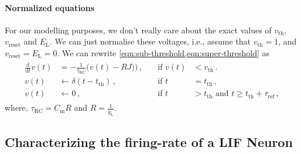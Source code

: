 \documentclass[10pt,letterpaper,oneside]{article}
\begin{document}

\paragraph{Normalized equations}
For our modelling purposes, we don't really care about the exact values of $v_\mathrm{th}$, $v_\mathrm{reset}$ and $E_\mathrm{L}$. We can just normalise these voltages, i.e., assume that $v_\mathrm{th} = 1$, and $v_\mathrm{reset} = E_\mathrm{L} = 0$. We can rewrite \cref{eqn:sub-threshold,eqn:super-threshold} as
\begin{align}
	\begin{aligned}
		\frac{\mathrm{d}}{\mathrm{d}t} v(t) &= -\frac{1}{\tau_\mathrm{RC}} \big( v(t) - RJ \big)
		\big) \,, \quad &\text{if } v(t) &< v_\mathrm{th}\,. \\
		v(t) &\gets \delta(t - t_\mathrm{th}) \,, &\text{if } t &= t_\mathrm{th} \,,\\
v(t) &\gets 0 \,, &\text{if } t &> t_\mathrm{th} \text{ and } t \geq t_\mathrm{th} + \tau_\mathrm{ref} \,,
	\end{aligned}
	\label{eqn:sub-threshold-normalised}
\end{align}
where, $\tau_\mathrm{RC} = C_\mathrm{m} R$ and $R = \frac{1}{g_\mathrm{L}}$.

\subsection{Characterizing the firing-rate of a LIF Neuron}
\end{document}
